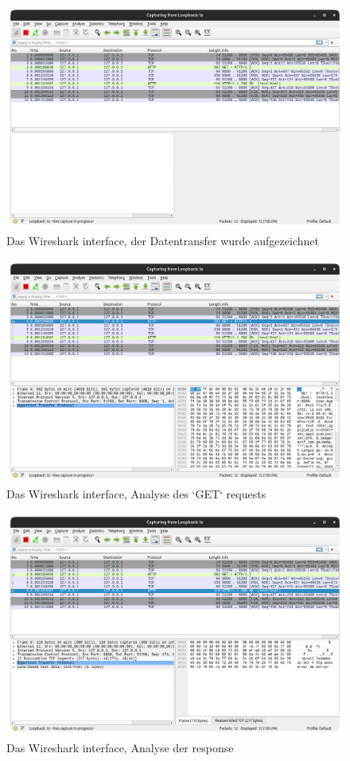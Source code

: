 \documentclass[12pt]{article}
\begin{document}
\begin{figure}[h]
	\centering
	\includegraphics[scale=0.3]{Bilder/Anlagen_3}
	\caption{Das Wireshark interface, der Datentransfer wurde aufgezeichnet \cite{screenshots-self}}
	\label{fig:figure32}
\end{figure}

\begin{figure}[h]
	\centering
	\includegraphics[scale=0.3]{Bilder/Anlagen_4}
	\caption{Das Wireshark interface, Analyse des `GET` requests \cite{screenshots-self}}
	\label{fig:figure33}
\end{figure}

\begin{figure}[h]
	\centering
	\includegraphics[scale=0.3]{Bilder/Anlagen_5}
	\caption{Das Wireshark interface, Analyse der response \cite{screenshots-self}}
	\label{fig:figure34}
\end{figure}
\end{document}
